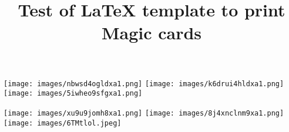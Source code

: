 \documentclass[a4paper,12pt]{article}
\title{Test of LaTeX template to print Magic cards}
\begin{document}
\thispagestyle{empty}


\texttt{[image: images/nbwsd4ogldxa1.png]}
\texttt{[image: images/k6drui4hldxa1.png]}
\texttt{[image: images/5iwheo9sfgxa1.png]}

\texttt{[image: images/xu9u9jomh8xa1.png]}
\texttt{[image: images/8j4xnclnm9xa1.png]}
\texttt{[image: images/6TMtlol.jpeg]}

\newpage
\end{document}
